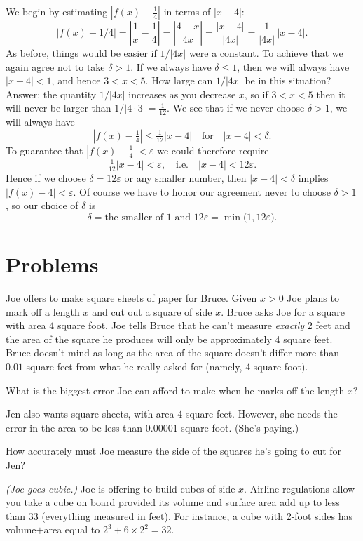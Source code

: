 We begin by estimating $|f(x)-\frac14|$ in terms of $|x-4|$:
\[
|f(x)-1/4| = \left|\frac1x-\frac14\right| = \left| \frac{4-x}{4x}\right| =
\frac{|x-4|}{|4x|} =\frac{1}{|4x|}\,|x-4|.
\]
As before, things would be easier if $1/|4x|$ were a constant.  To achieve that
we again agree not to take $\delta>1$.  If we always have $\delta\leq 1$, then
we will always have $|x-4|<1$, and hence $3<x<5$.  How large can $1/|4x|$ be in
this situation?  Answer: the quantity $1/|4x|$ increases as you decrease $x$, so
if $3<x<5$ then it will never be larger than $1/|4\cdot 3| = \frac1{12}$.
We see that if we never choose $\delta>1$, we will always have
\[
|f(x) - \tfrac14|\leq \tfrac1{12}|x-4| \quad\text{for}\quad |x-4|<\delta.
\]
To guarantee that $|f(x)-\frac14|<\varepsilon$ we could therefore require
\[
\tfrac1{12} |x-4|<\varepsilon, \quad\text{i.e.}\quad |x-4| <12\varepsilon.
\]
Hence if we choose $\delta=12\varepsilon$ or any smaller number, then
$|x-4|<\delta$ implies $|f(x)-4|<\varepsilon$.  Of course we have to honor
our agreement never to choose $\delta>1$, so our choice of $\delta$ is
\[
\delta = \text{the smaller of }1\text{ and }12\varepsilon = \min \bigl(1,
12\varepsilon\bigr).
\]

\section{Problems} 
\problemfont 
\problem \groupproblem Joe offers to make square sheets of paper for 
Bruce.  Given $x>0$ Joe plans to mark off a length $x$ and cut out a
square of side $x$.  Bruce asks Joe for a square with area 4 square
foot.  Joe tells Bruce that he can't measure \emph{exactly} 2 feet and
the area of the square he produces will only be approximately 4 square
feet.  Bruce doesn't mind as long as the area of the square doesn't
differ more than $0.01$ square feet from what he really asked for
(namely, 4 square foot).

\subprob What is the biggest error Joe can afford to make when he
marks off the length $x$?

\subprob Jen also wants square sheets, with area $4$ square feet.
However, she needs the error in the area to be less than $0.00001$
square foot.  (She's paying.)

How accurately must Joe measure the side of the squares he's going to cut
for Jen?

\problem \groupproblem \textit{(Joe goes cubic.)}  Joe is offering to 
build cubes of side $x$.  Airline regulations allow you take a cube on
board provided its volume and surface area add up to less than $33$
(everything measured in feet).  For instance, a cube with 2-foot sides
has volume$+$area equal to $2^3 + 6\times 2^2 = 32$.

